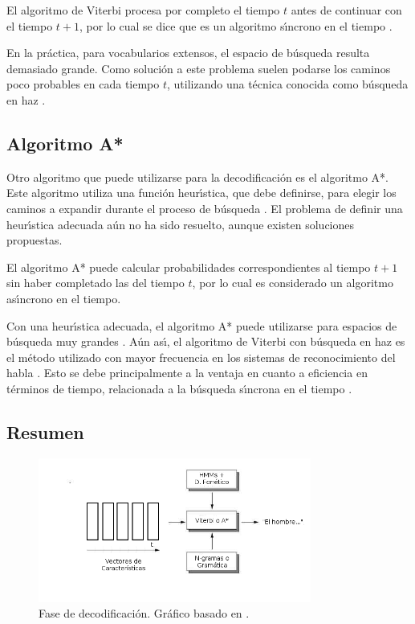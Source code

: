 El algoritmo de Viterbi procesa por completo el tiempo $t$ antes de continuar con el tiempo $t + 1$, por
lo cual se dice que es un algoritmo s{\'\i}ncrono en el tiempo \cite{huang-handbook10}.

En la pr\'actica, para vocabularios extensos, el espacio de b\'usqueda resulta demasiado grande.
Como soluci\'on a este problema suelen podarse los caminos poco probables en cada tiempo $t$,
utilizando una t\'ecnica conocida como b\'usqueda en haz \cite{Jurafsky}.

\subsection{Algoritmo A*}

Otro algoritmo que puede utilizarse para la decodificaci\'on es el algoritmo A*. Este algoritmo
utiliza una funci\'on heur{\'\i}stica, que debe definirse, para elegir los caminos a expandir
durante el proceso de b\'usqueda \cite{Russell2003Solving}. 
El problema de definir una heur{\'\i}stica adecuada a\'un no ha sido resuelto, aunque existen soluciones propuestas.

El algoritmo A* puede calcular probabilidades correspondientes al tiempo $t + 1$ sin haber completado 
las del tiempo $t$, por lo cual es considerado un algoritmo as{\'\i}ncrono en el tiempo.

Con una heur{\'\i}stica adecuada, el algoritmo A* puede utilizarse para espacios de b\'usqueda 
muy grandes \cite{huang-handbook10}.
A\'un as{\'\i}, el algoritmo de Viterbi con b\'usqueda en haz es el m\'etodo utilizado con mayor frecuencia
en los sistemas de reconocimiento del habla \cite{huang-handbook10}. 
Esto se debe principalmente a la ventaja en cuanto a eficiencia en t\'erminos de tiempo, 
relacionada a la b\'usqueda s{\'\i}ncrona en el tiempo \cite{huang-handbook10}.


\subsection{Resumen}

\begin{figure}[H] 
\centering
\includegraphics[width=0.8\textwidth]{./graphics/decodificacion.png}
\caption{Fase de decodificaci\'on. Gr\'afico basado en \cite{VerenichASR}.}
\label{figure:decoding}
\end{figure}


